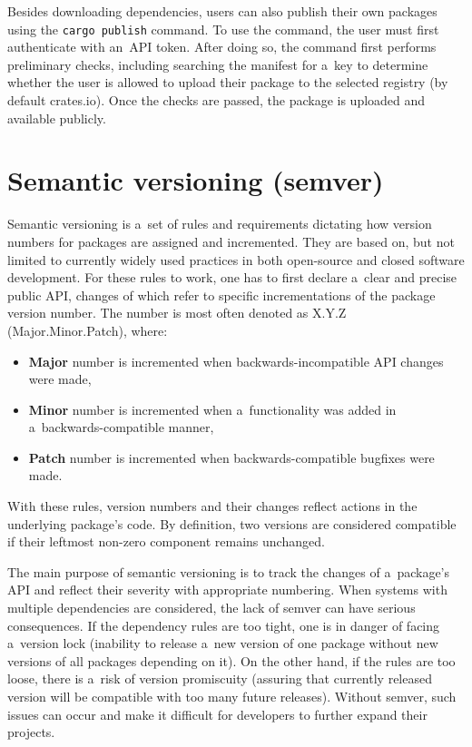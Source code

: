 \documentclass[licencjacka,en]{pracamgr}
\begin{document}
Besides downloading dependencies, users can also publish their own packages using
the \texttt{cargo publish} command. To use the command, the user must first authenticate with
an~API token. After doing so, the command first performs preliminary checks, including searching
the manifest for a~key to determine whether the user is allowed to upload their package
to the selected registry (by default crates.io). Once the checks are passed, the package is
uploaded and available publicly.

\section{Semantic versioning (semver)}\label{r:section_semver}

Semantic versioning is a~set of rules and requirements dictating how version numbers for packages
are assigned and incremented. They are based on, but not limited to currently widely used
practices in both open-source and closed software development. For these rules to work, one has to
first declare a~clear and precise public API, changes of which refer to specific incrementations of
the package version number. The number is most often denoted as X.Y.Z (Major.Minor.Patch), where:
\begin{itemize}
	\item \textbf{Major} number is incremented when backwards-incompatible API changes were made,
	\item \textbf{Minor} number is incremented when a~functionality was added in
		a~backwards-compatible manner,
	\item \textbf{Patch} number is incremented when backwards-compatible bugfixes were made.
\end{itemize}
With these rules, version numbers and their changes reflect actions in the underlying
package's code. By definition, two versions are considered compatible if their leftmost non-zero
component remains unchanged.

The main purpose of semantic versioning is to track the changes of a~package's API and reflect
their severity with appropriate numbering.
When systems with multiple dependencies are considered, the lack of semver can have serious
consequences. If the dependency rules are too tight, one is in danger of facing a~version lock
(inability to release a~new version of one package without new versions of all packages depending
on it). On the other hand, if the rules are too loose, there is a~risk of version promiscuity
(assuring that currently released version will be compatible with too many future releases).
Without semver, such issues can occur and make it difficult for developers to further expand
their projects.
\end{document}
